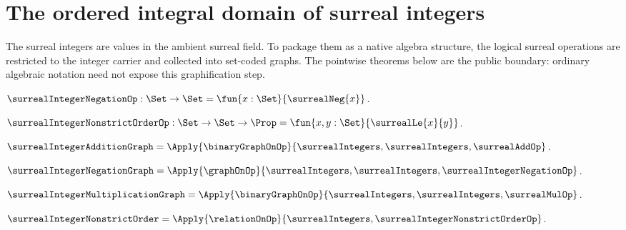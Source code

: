 \section{The ordered integral domain of surreal integers}





The surreal integers are values in the ambient surreal field.  To package
them as a native algebra structure, the logical surreal operations are
restricted to the integer carrier and collected into set-coded graphs.  The
pointwise theorems below are the public boundary: ordinary algebraic notation
need not expose this graphification step.

\begin{definition}\label{surreal_integer_negation_op}
    $\surrealIntegerNegationOp:\Set\to\Set
        =\fun{x:\Set}{\surrealNeg{x}}$.
\end{definition}

\begin{definition}\label{surreal_integer_nonstrict_order_op}
    $\surrealIntegerNonstrictOrderOp:\Set\to\Set\to\Prop
        =\fun{x,y:\Set}{\surrealLe{x}{y}}$.
\end{definition}

\begin{definition}\label{surreal_integer_addition_graph}
    $\surrealIntegerAdditionGraph=
        \Apply{\binaryGraphOnOp}
            {\surrealIntegers,\surrealIntegers,\surrealAddOp}$.
\end{definition}

\begin{definition}\label{surreal_integer_negation_graph}
    $\surrealIntegerNegationGraph=
        \Apply{\graphOnOp}
            {\surrealIntegers,\surrealIntegers,\surrealIntegerNegationOp}$.
\end{definition}

\begin{definition}\label{surreal_integer_multiplication_graph}
    $\surrealIntegerMultiplicationGraph=
        \Apply{\binaryGraphOnOp}
            {\surrealIntegers,\surrealIntegers,\surrealMulOp}$.
\end{definition}

\begin{definition}\label{surreal_integer_nonstrict_order}
    $\surrealIntegerNonstrictOrder=
        \Apply{\relationOnOp}
            {\surrealIntegers,\surrealIntegerNonstrictOrderOp}$.
\end{definition}

